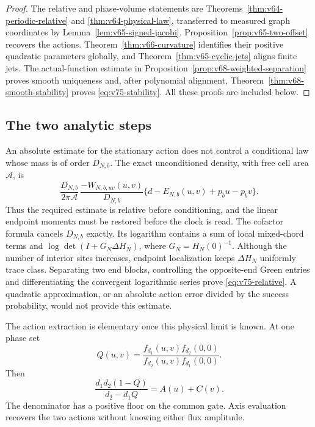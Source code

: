\begin{proof}
The relative and phase-volume statements are
Theorems~\ref{thm:v64-periodic-relative} and
\ref{thm:v64-physical-law}, transferred to measured graph coordinates
by Lemma~\ref{lem:v65-signed-jacobi}.
Proposition~\ref{prop:v65-two-offset} recovers the actions.
Theorem~\ref{thm:v66-curvature} identifies their positive quadratic
parameters globally, and Theorem~\ref{thm:v65-cyclic-jets} aligns
finite jets.  The actual-function estimate in
Proposition~\ref{prop:v68-weighted-separation} proves smooth uniqueness
and, after polynomial alignment, Theorem~\ref{thm:v68-smooth-stability}
proves \eqref{eq:v75-stability}.  All these proofs are included below.
\end{proof}

\subsection{The two analytic steps}

An absolute estimate for the stationary action does not control a
conditional law whose mass is of order $D_{N,b}$.  The exact
unconditioned density, with free cell area $\mathcal A$, is
\begin{equation}\label{eq:v75-physical}
 \frac{D_{N,b}}{2\pi\mathcal A}\,
 \frac{-W_{N,b,uv}(u,v)}{D_{N,b}}
       \{d-E_{N,b}(u,v)+p_bu-p_bv\}.
\end{equation}
Thus the required estimate is relative before conditioning, and the
linear endpoint momenta must be restored before the clock is read.
The cofactor formula cancels $D_{N,b}$ exactly.  Its logarithm contains
a sum of local mixed-chord terms and
$\log\det(I+G_N\Delta H_N)$, where $G_N=H_N(0)^{-1}$.
Although the number of interior sites increases, endpoint localization
keeps $\Delta H_N$ uniformly trace class.  Separating two end blocks,
controlling the opposite-end Green entries and differentiating the
convergent logarithmic series prove \eqref{eq:v75-relative}.
A quadratic approximation, or an absolute action error divided by the
success probability, would not provide this estimate.

The action extraction is elementary once this physical limit is known.
At one phase set
\[
 Q(u,v)=\frac{f_{d_1}(u,v)f_{d_2}(0,0)}
                 {f_{d_2}(u,v)f_{d_1}(0,0)}.
\]
Then
\[
 \frac{d_1d_2(1-Q)}{d_2-d_1Q}=A(u)+C(v).
\]
The denominator has a positive floor on the common gate.  Axis evaluation
recovers the two actions without knowing either flux amplitude.

